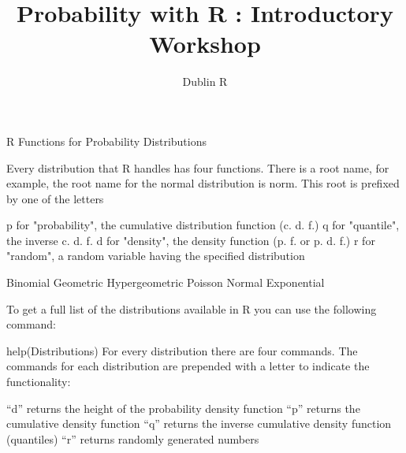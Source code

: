\documentclass[12pt, a4paper]{article}
\author{ }
\theoremstyle{plain}
\theoremstyle{definition}
\theoremstyle{remark}
\begin{document}
\author{Dublin R}
\title{Probability with R : Introductory Workshop}
\maketitle

R Functions for Probability Distributions

Every distribution that R handles has four functions. There is a root name, for example, the root name for the normal distribution is norm. This root is prefixed by one of the letters

p for "probability", the cumulative distribution function (c. d. f.)
q for "quantile", the inverse c. d. f.
d for "density", the density function (p. f. or p. d. f.)
r for "random", a random variable having the specified distribution


\newpage
Binomial
Geometric
Hypergeometric
Poisson
Normal
Exponential

To get a full list of the distributions available in R you can use the following command:

help(Distributions)
For every distribution there are four commands. The commands for each distribution are prepended with a letter to indicate the functionality:

“d”	returns the height of the probability density function
“p”	returns the cumulative density function
“q”	returns the inverse cumulative density function (quantiles)
“r”	returns randomly generated numbers
\end{document}
